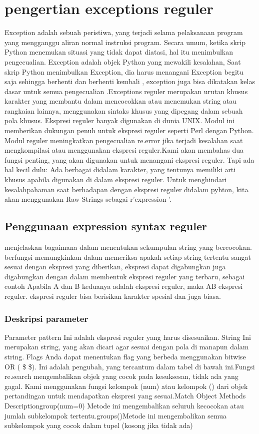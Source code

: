 \section {pengertian exceptions reguler}
Exception adalah sebuah peristiwa, yang terjadi selama pelaksanaan program yang mengganggu aliran normal instruksi program. Secara umum, ketika skrip Python menemukan situasi yang tidak dapat diatasi, hal itu menimbulkan pengecualian. Exception adalah objek Python yang mewakili kesalahan, Saat  skrip Python menimbulkan Exception, dia harus menangani Exception begitu saja sehingga berhenti dan berhenti kembali , exception juga bisa dikatakan kelas dasar untuk semua pengecualian .Exceptions reguler merupakan urutan khusus karakter yang membantu dalam mencocokkan atau menemukan string atau rangkaian lainnya, menggunakan sintaks khusus yang dipegang dalam sebuah pola khusus. Ekspresi reguler banyak digunakan di dunia UNIX. Modul ini memberikan dukungan penuh untuk ekspresi reguler seperti Perl dengan Python. Modul reguler meningkatkan pengecualian re.error jika terjadi kesalahan saat mengkompilasi atau menggunakan ekspresi reguler.Kami akan membahas dua fungsi penting, yang akan digunakan untuk menangani ekspresi reguler. Tapi ada hal kecil dulu: Ada berbagai didalam karakter, yang tentunya memiliki arti khusus apabila digunakan di dalam ekspresi reguler. Untuk menghindari kesalahpahaman  saat berhadapan dengan ekspresi reguler didalam pyhton, kita akan menggunakan Raw Strings sebagai r'expression '.

\subsection {Penggunaan expression syntax reguler}
menjelaskan bagaimana dalam menentukan sekumpulan string yang bercocokan. berfungsi memungkinkan dalam memeriksa apakah setiap string
tertentu sangat sesuai dengan ekspresi yang diberikan, ekspresi dapat digabungkan juga digabungkan dengan dalam membentuk ekspresi reguler yang terbaru, sebagai contoh Apabila A dan B  keduanya adalah ekspresi reguler, maka AB ekspresi reguler. ekspresi reguler 
bisa berisikan karakter spesial dan juga biasa.

\subsubsection {Deskripsi parameter}
Parameter pattern Ini adalah ekspresi reguler yang harus disesuaikan. String Ini merupakan string, yang akan dicari agar sesuai dengan pola di manapun dalam string. Flags Anda dapat menentukan flag yang berbeda menggunakan bitwise OR ( \$  \vert  \$). Ini adalah pengubah, yang tercantum dalam tabel di bawah ini.Fungsi re.search mengembalikan objek yang cocok pada kesuksesan, tidak ada yang gagal. Kami menggunakan fungsi kelompok (num) atau kelompok () dari objek pertandingan untuk mendapatkan ekspresi yang sesuai.Match Object Methods Descriptiongroup(num=0) Metode ini mengembalikan seluruh kecocokan atau jumlah subkelompok tertentu.groups()Metode ini mengembalikan semua subkelompok yang cocok dalam tupel (kosong jika tidak ada) 

